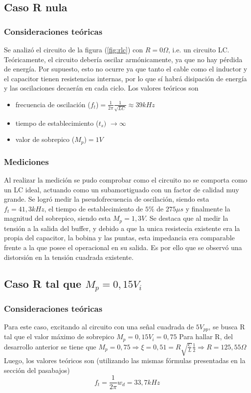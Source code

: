 \subsection{Caso R nula}
\subsubsection{Consideraciones teóricas}
Se analizó el circuito de la figura (\ref{fig:rlc}) con $R=0\Omega$, i.e. un circuito LC. Teóricamente, el circuito debería oscilar armónicamente, ya que no hay pérdida de energía. Por supuesto, esto no ocurre ya que tanto el cable como el inductor y el capacitor tienen resistencias internas, por lo que sí habrá disipación de energía y las oscilaciones decaerán en cada ciclo.
Los valores teóricos son
\begin{itemize}
  \item frecuencia de oscilación ($f_t$)$=\frac{1}{2\pi}\frac{1}{\sqrt{LC}}\approx 39 kHz$
  \item tiempo de establecimiento ($t_s)$ $\rightarrow \infty$
  \item valor de sobrepico ($M_p$)$=1 V$
\end{itemize}
\subsubsection{Mediciones}

Al realizar la medición se pudo comprobar como el circuito no se comporta como un LC ideal, actuando como un subamortiguado con un factor de calidad muy grande. Se logró medir la pseudofrecuencia de oscilación, siendo esta $f_t= 41,3 kHz$, el tiempo de establecimiento de $5\%$ de $275\mu s$ y finalmente la magnitud del sobrepico, siendo esta $M_p=1,3 V$.
Se destaca que al medir la tensión a la salida del buffer, y debido a que la unica resistecia existente era la propia del capacitor, la bobina y las puntas, esta impedancia era comparable frente a la que posee el operacional en su salida. Es por ello que se observó una distorsión en la tensión cuadrada existente.

\subsection{Caso R tal que $M_p=0,15V_i$}
\subsubsection{Consideraciones teóricas}
Para este caso, excitando al circuito con una señal cuadrada de $5 V_{pp}$, se busca R tal que el valor máximo de sobrepico $M_p=0,15V_i=0,75$
Para hallar R, del desarrollo anterior se tiene que $M_p=0,75\Rightarrow \xi=0,51=R\sqrt{\frac{C}{L}}\frac{1}{2} \Rightarrow R=125,55\Omega $
Luego, los valores teóricos son (utilizando las mismas fórmulas presentadas en la sección del pasabajos) 
\begin{equation}
    f_t=\frac{1}{2\pi}w_d=33,7 kHz
\end{equation}

